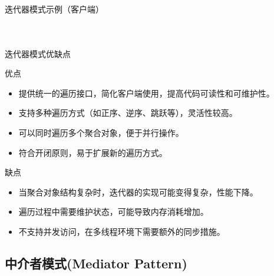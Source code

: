 \documentclass[UTF8,aspectratio=169]{beamer}
\begin{document}
\begin{frame}{迭代器模式示例（客户端）}
    \begin{columns}
        \begin{column}{0.48\textwidth}
            \inputminted[firstline=63, lastline=68]{cpp}{code/iterator_pattern.cpp}
        \end{column}
        \begin{column}{0.48\textwidth}
            \inputminted[firstline=70, lastline=87]{cpp}{code/iterator_pattern.cpp}
        \end{column}
    \end{columns}
\end{frame}

\begin{frame}{迭代器模式优缺点}
    \begin{ytublock}{优点}
        \begin{itemize}
            \item 提供统一的遍历接口，简化客户端使用，提高代码可读性和可维护性。
            \item 支持多种遍历方式（如正序、逆序、跳跃等），灵活性较高。
            \item 可以同时遍历多个聚合对象，便于并行操作。
            \item 符合开闭原则，易于扩展新的遍历方式。
        \end{itemize}
    \end{ytublock}
    \begin{alertytublock}{缺点}
        \begin{itemize}
            \item 当聚合对象结构复杂时，迭代器的实现可能变得复杂，性能下降。
            \item 遍历过程中需要维护状态，可能导致内存消耗增加。
            \item 不支持并发访问，在多线程环境下需要额外的同步措施。
        \end{itemize}
    \end{alertytublock}
\end{frame}

\subsection{中介者模式(Mediator Pattern)}
\end{document}
